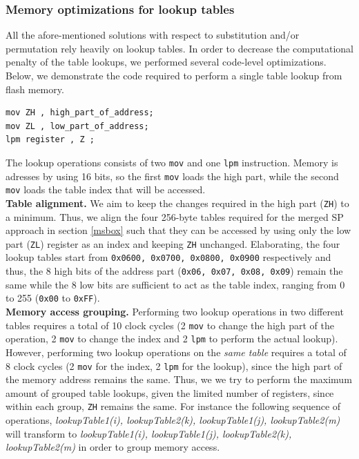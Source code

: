 \documentclass[11pt]{article}
\begin{document}
\subsubsection{Memory optimizations for lookup tables}
All the afore-mentioned solutions with respect to substitution and/or permutation rely heavily on lookup tables. In order to decrease the computational penalty of the table lookups, we performed several code-level optimizations. Below, we demonstrate the code required to perform a single table lookup from flash memory.
\begin{verbatim}
mov ZH , high_part_of_address; 
mov ZL , low_part_of_address; 
lpm register , Z ;
\end{verbatim}
The lookup operations consists of two \texttt{mov} and one \texttt{lpm} instruction. Memory is adresses by using 16 bits, so the first \texttt{mov} loads the high part, while the second \texttt{mov} loads the table index that will be accessed.\\
\textbf{Table alignment.} We aim to keep the changes required in the high part (\texttt{ZH}) to a minimum. Thus, we align the four 256-byte tables required for the merged SP approach in section \ref{msbox} such that they can be accessed by using only the  low part (\texttt{ZL}) register as an index and keeping \texttt{ZH} unchanged. Elaborating, the four lookup tables start from \texttt{0x0600, 0x0700, 0x0800, 0x0900} respectively and thus, the 8 high bits of the address part (\texttt{0x06, 0x07, 0x08, 0x09}) remain the same while the 8 low bits are sufficient to act as the table index, ranging from 0 to 255 (\texttt{0x00} to \texttt{0xFF}). \\
\textbf{Memory access grouping.} Performing two lookup operations in two different tables requires a total of 10 clock cycles (2 \texttt{mov} to change the high part of the operation, 2 \texttt{mov} to change the index and 2 \texttt{lpm} to perform the actual lookup). However, performing two lookup operations on the \emph{same table} requires a total of 8 clock cycles (2 \texttt{mov} for the index, 2 \texttt{lpm} for the lookup), since the high part of the memory address remains the same. Thus, we 
we try to perform the maximum amount of grouped table lookups, given the limited number of registers, since within each group, \texttt{ZH} remains the same. For instance the following sequence of operations, \emph{ lookupTable1(i), lookupTable2(k), lookupTable1(j), lookupTable2(m)} will transform to \emph{ lookupTable1(i), lookupTable1(j), lookupTable2(k), lookupTable2(m)} in order to group memory access.
\end{document}
